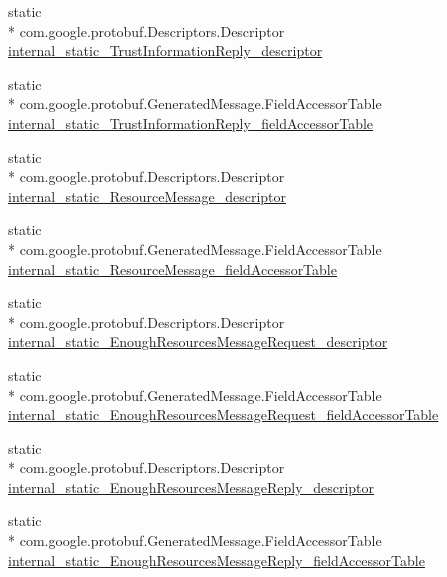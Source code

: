 \begin{DoxyCompactItemize}
\item 
static \\*
com.\+google.\+protobuf.\+Descriptors.\+Descriptor \hyperlink{classeu_1_1uloop_1_1messages_1_1UloopMessages_a8422666b5aae3440210ca268f96b31fd}{internal\+\_\+static\+\_\+\+Trust\+Information\+Reply\+\_\+descriptor}
\item 
static \\*
com.\+google.\+protobuf.\+Generated\+Message.\+Field\+Accessor\+Table \hyperlink{classeu_1_1uloop_1_1messages_1_1UloopMessages_ac5eadf2024818c42a966293a0e8913f3}{internal\+\_\+static\+\_\+\+Trust\+Information\+Reply\+\_\+field\+Accessor\+Table}
\item 
static \\*
com.\+google.\+protobuf.\+Descriptors.\+Descriptor \hyperlink{classeu_1_1uloop_1_1messages_1_1UloopMessages_a437d118939f90ea7390b61e9b6d1f14f}{internal\+\_\+static\+\_\+\+Resource\+Message\+\_\+descriptor}
\item 
static \\*
com.\+google.\+protobuf.\+Generated\+Message.\+Field\+Accessor\+Table \hyperlink{classeu_1_1uloop_1_1messages_1_1UloopMessages_a779fc46d71f92f0e1a202d24851d6d12}{internal\+\_\+static\+\_\+\+Resource\+Message\+\_\+field\+Accessor\+Table}
\item 
static \\*
com.\+google.\+protobuf.\+Descriptors.\+Descriptor \hyperlink{classeu_1_1uloop_1_1messages_1_1UloopMessages_a6c5e33e803615ad68afaa7964ddbccf4}{internal\+\_\+static\+\_\+\+Enough\+Resources\+Message\+Request\+\_\+descriptor}
\item 
static \\*
com.\+google.\+protobuf.\+Generated\+Message.\+Field\+Accessor\+Table \hyperlink{classeu_1_1uloop_1_1messages_1_1UloopMessages_ac36c402f4d353cb8cfc600c251418f26}{internal\+\_\+static\+\_\+\+Enough\+Resources\+Message\+Request\+\_\+field\+Accessor\+Table}
\item 
static \\*
com.\+google.\+protobuf.\+Descriptors.\+Descriptor \hyperlink{classeu_1_1uloop_1_1messages_1_1UloopMessages_a2c059efcf8b7786c85652dc9d00807d0}{internal\+\_\+static\+\_\+\+Enough\+Resources\+Message\+Reply\+\_\+descriptor}
\item 
static \\*
com.\+google.\+protobuf.\+Generated\+Message.\+Field\+Accessor\+Table \hyperlink{classeu_1_1uloop_1_1messages_1_1UloopMessages_ae18af8b65d7a3d8ef4178dd00f396109}{internal\+\_\+static\+\_\+\+Enough\+Resources\+Message\+Reply\+\_\+field\+Accessor\+Table}

\end{DoxyCompactItemize}
